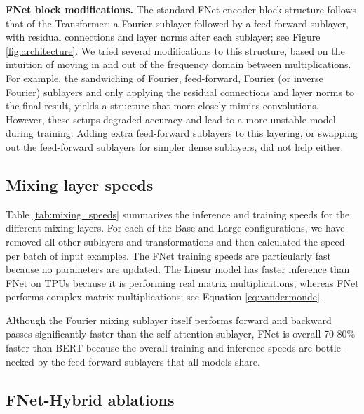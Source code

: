 \documentclass[11pt]{article}
\begin{document}
\textbf{FNet block modifications.} The standard FNet encoder block structure follows that of the Transformer: a Fourier sublayer followed by a feed-forward sublayer, with residual connections and layer norms after each sublayer; see Figure \ref{fig:architecture}. We tried several modifications to this structure, based on the intuition of moving in and out of the frequency domain between multiplications. For example, the sandwiching of Fourier, feed-forward, Fourier (or inverse Fourier) sublayers and only applying the residual connections and layer norms to the final result, yields a structure that more closely mimics convolutions. However, these setups degraded accuracy and lead to a more unstable model during training. Adding extra feed-forward sublayers to this layering, or swapping out the feed-forward sublayers for simpler dense sublayers, did not help either.




\subsection{Mixing layer speeds}
\label{app:mixing_speeds}

Table \ref{tab:mixing_speeds} summarizes the inference and training speeds for the different mixing layers. For each of the Base and Large configurations, we have removed all other sublayers and transformations and then calculated the speed per batch of input examples. The FNet training speeds are particularly fast because no parameters are updated. The Linear model has faster inference than FNet on TPUs because it is performing real matrix multiplications, whereas FNet performs complex matrix multiplications; see Equation \eqref{eq:vandermonde}.

Although the Fourier mixing sublayer itself performs forward and backward passes significantly faster than the self-attention sublayer, FNet is overall 70-80\% faster than BERT because the overall training and inference speeds are bottle-necked by the feed-forward sublayers that all models share.

\subsection{FNet-Hybrid ablations}
\label{app:hybrid_ablations}
\end{document}
